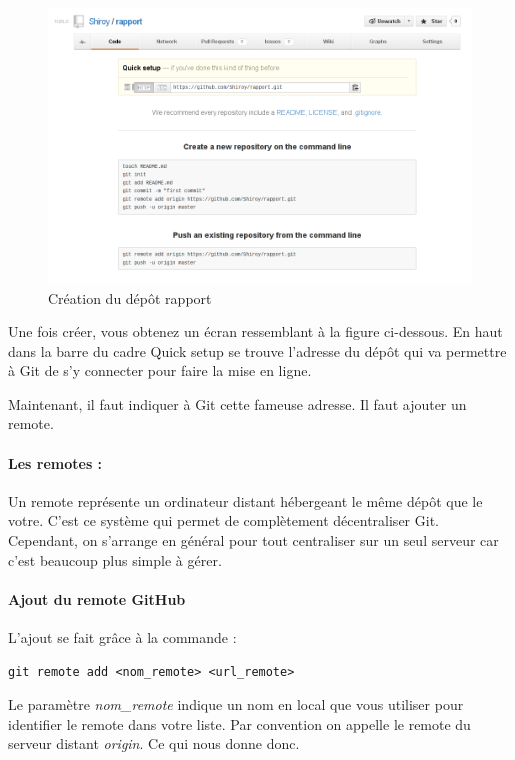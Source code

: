 \documentclass[a4paper]{article}
\begin{document}
\begin{figure}
\includegraphics[scale=0.6]{creation_depot.png}
\caption{Création du dép\^ot rapport}
\end{figure}

Une fois créer, vous obtenez un écran ressemblant à la figure ci-dessous. En haut dans la barre du cadre \og Quick setup \fg se trouve l'adresse du dépôt qui va permettre à Git de s'y connecter pour faire la mise en ligne.

Maintenant, il faut indiquer à Git cette fameuse adresse. Il faut ajouter un remote.

\paragraph{Les remotes :}Un remote représente un ordinateur distant hébergeant le même dépôt que le votre. C'est ce système qui permet de complètement décentraliser Git. Cependant, on s'arrange en général pour tout centraliser sur un seul serveur car c'est beaucoup plus simple à gérer.

\paragraph{Ajout du remote GitHub} L'ajout se fait grâce à la commande :

\begin{verbatim}
git remote add <nom_remote> <url_remote>
\end{verbatim}

Le paramètre \emph{nom\_remote} indique un nom en local que vous utiliser pour identifier le remote dans votre liste. Par convention on  appelle le remote du serveur distant \textit{origin}. Ce qui nous donne donc.
\end{document}
